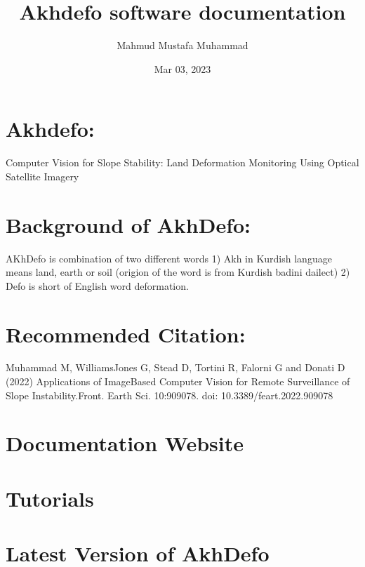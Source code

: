 \documentclass[letterpaper,10pt]{sphinxmanual}
\title{Akhdefo software documentation}
\date{Mar 03, 2023}
\author{Mahmud Mustafa Muhammad}
\begin{document}
\pagestyle{empty}
\cover
\pagestyle{plain}
\sphinxtableofcontents
\pagestyle{normal}
\label{\detokenize{index::doc}}


\sphinxstepscope


\chapter{Akhdefo:}
\label{\detokenize{README:akhdefo}}\label{\detokenize{README::doc}}
\sphinxAtStartPar
Computer Vision for Slope Stability: Land Deformation Monitoring Using Optical Satellite Imagery


\chapter{Background of Akh\sphinxhyphen{}Defo:}
\label{\detokenize{README:background-of-akh-defo}}
\sphinxAtStartPar
AKh\sphinxhyphen{}Defo is combination of two different words 1) Akh in Kurdish language means land, earth or soil (origion of the word is from Kurdish badini dailect) 2) Defo is short of English word deformation.


\chapter{Recommended Citation:}
\label{\detokenize{README:recommended-citation}}
\sphinxAtStartPar
Muhammad M, Williams\sphinxhyphen{}Jones G, Stead D, Tortini R, Falorni G and Donati D (2022) Applications of ImageBased Computer Vision for Remote Surveillance of Slope Instability.Front. Earth Sci. 10:909078. doi: 10.3389/feart.2022.909078


\chapter{Documentation Website}
\label{\detokenize{README:documentation-website}}

\chapter{Tutorials}
\label{\detokenize{README:tutorials}}

\chapter{Latest Version of AkhDefo}
\label{\detokenize{README:latest-version-of-akhdefo}}
\end{document}
